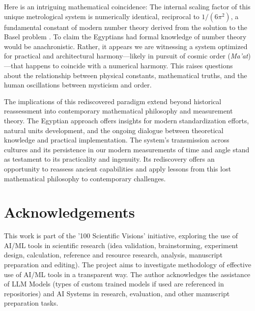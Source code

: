 \documentclass[11pt]{article}
\begin{document}
Here is an intriguing mathematical coincidence: The internal scaling factor of this unique metrological system is numerically identical, reciprocal to $1/(6\pi^2)$, a fundamental constant of modern number theory derived from the solution to the Basel problem \cite{dunham1999euler}. To claim the Egyptians had formal knowledge of number theory would be anachronistic. Rather, it appears we are witnessing a system optimized for practical and architectural harmony---likely in pursuit of cosmic order (\textit{Ma'at})---that happens to coincide with a numerical harmony. This raises questions about the relationship between physical constants, mathematical truths, and the human oscillations between mysticism and order.

The implications of this rediscovered paradigm extend beyond historical reassessment into contemporary mathematical philosophy and measurement theory. The Egyptian approach offers insights for modern standardization efforts, natural units development, and the ongoing dialogue between theoretical knowledge and practical implementation. The system's transmission across cultures and its persistence in our modern measurements of time and angle stand as testament to its practicality and ingenuity. Its rediscovery offers an opportunity to reassess ancient capabilities and apply lessons from this lost mathematical philosophy to contemporary challenges.


\section*{Acknowledgements}
\label{sec:acknowledgements} %

This work is part of the '100 Scientific Visions' initiative, exploring the use of AI/ML tools in scientific research (idea validation, brainstorming, experiment design, calculation, reference and resource research, analysis, manuscript preparation and editing). The project aims to investigate methodology of effective use of AI/ML tools in a transparent way. The author acknowledges the assistance of LLM Models (types of custom trained models if used are referenced in repositories) and AI Systems in research, evaluation, and other manuscript preparation tasks.
\end{document}
